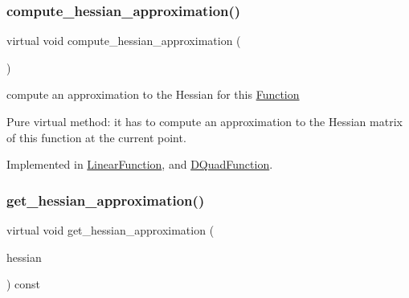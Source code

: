\subsubsection{\texorpdfstring{compute\+\_\+hessian\+\_\+approximation()}{compute\_hessian\_approximation()}}
{\footnotesize\ttfamily virtual void compute\+\_\+hessian\+\_\+approximation (\begin{DoxyParamCaption}\item[{void}]{ }\end{DoxyParamCaption})\hspace{0.3cm}{\ttfamily [pure virtual]}}



compute an approximation to the Hessian for this \mbox{\hyperlink{class_s_m_spp__di__unipi__it_1_1_function}{Function}} 

Pure virtual method\+: it has to compute an approximation to the Hessian matrix of this function at the current point. 

Implemented in \mbox{\hyperlink{class_s_m_spp__di__unipi__it_1_1_linear_function_a4aab1ee65194b8af72eb1c122205c707}{Linear\+Function}}, and \mbox{\hyperlink{class_s_m_spp__di__unipi__it_1_1_d_quad_function_a8f0ae6fd266900dca237c8c29b69cd5f}{D\+Quad\+Function}}.

\mbox{\label{class_s_m_spp__di__unipi__it_1_1_c15_function_a83dab9644742319aa313786952a15a78}} 
\subsubsection{\texorpdfstring{get\+\_\+hessian\+\_\+approximation()}{get\_hessian\_approximation()}\hspace{0.1cm}{\footnotesize\ttfamily [1/2]}}
{\footnotesize\ttfamily virtual void get\+\_\+hessian\+\_\+approximation (\begin{DoxyParamCaption}\item[{\mbox{\hyperlink{class_s_m_spp__di__unipi__it_1_1_c15_function_ae7dd5ecf6e8711dc10787bb8d80b355b}{Dense\+Hessian}} \&}]{hessian }\end{DoxyParamCaption}) const\hspace{0.3cm}{\ttfamily [pure virtual]}}



